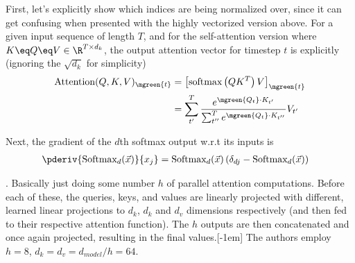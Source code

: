 \documentclass[11pt]{article}
\begin{document}
\begin{compactitem}
	First, let's explicitly show which indices are being normalized over, since it can get confusing when presented with the highly vectorized version above. For a given input sequence of length $T$, and for the self-attention version where $K \eq Q \eq V \in \R^{T \times d_{k}}$, the output attention vector for timestep $t$ is explicitly (ignoring the $\sqrt{d_k}$ for simplicity)
	\begin{align}
	\text{Attention}(Q, K, V)_{\mgreen{t}}
	&= \left[ \text{softmax}\left( Q K^T \right) V \right]_{\mgreen{t}} \\
	&= \sum_{t'}^{T} \dfrac{ e^{\mgreen{Q_t} \cdot K_{t'}}  }{  \sum_{t''}^{T} e^{\mgreen{Q_t} \cdot K_{t''}}    } V_{t'}
	\end{align} 
	
	Next, the gradient of the $d$th softmax output w.r.t its inputs is 
	\begin{align}
	\pderiv{ \text{Softmax}_d(\vec x) }{x_j} 
	&= \text{Softmax}_d(\vec x) \left(    \delta_{dj} - \text{Softmax}_d(\vec x)   \right)
	\end{align}
	
	
	
	\item {}. Basically just doing some number $h$ of parallel attention computations. Before each of these, the queries, keys, and values are linearly projected with different,
	learned linear projections to $d_k$, $d_k$ and $d_v$ dimensions respectively (and then fed to their respective attention function). The $h$ outputs are then concatenated and once again projected, resulting in the final values.[-1em]
	The authors employ $h = 8$, $d_k = d_v = d_{model} / h = 64$. 
\end{compactitem}
\end{document}
